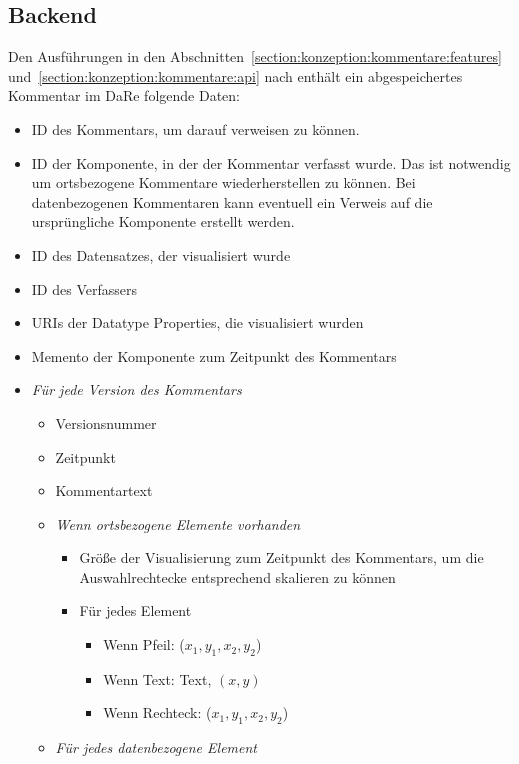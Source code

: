 \documentclass[
	headsepline,
	footsepline,
	fontsize=12pt,
	bibliography=totoc
]{scrbook}
\begin{document}
\subsection{Backend}
\label{section:konzeption:kommentare:backend}



Den Ausführungen in den Abschnitten~\ref{section:konzeption:kommentare:features} und~\ref{section:konzeption:kommentare:api} nach enthält ein abgespeichertes Kommentar im DaRe folgende Daten:

\begin{itemize}
	\item ID des Kommentars, um darauf verweisen zu können.
	\item ID der Komponente, in der der Kommentar verfasst wurde. Das ist notwendig um ortsbezogene Kommentare wiederherstellen zu können. Bei datenbezogenen Kommentaren kann eventuell ein Verweis auf die ursprüngliche Komponente erstellt werden.
	\item ID des Datensatzes, der visualisiert wurde
	\item ID des Verfassers
	\item URIs der Datatype Properties, die visualisiert wurden
	\item Memento der Komponente zum Zeitpunkt des Kommentars
	\item \textit{Für jede Version des Kommentars}
	\begin{itemize}
		\item Versionsnummer
		\item Zeitpunkt
		\item Kommentartext
		\item \textit{Wenn ortsbezogene Elemente vorhanden}
		\begin{itemize}
			\item Größe der Visualisierung zum Zeitpunkt des Kommentars, um die Auswahlrechtecke entsprechend skalieren zu können
			\item Für jedes Element
			\begin{itemize}
				\item Wenn Pfeil: ($x_1,y_1,x_2,y_2$)
				\item Wenn Text: Text, $(x,y)$
				\item Wenn Rechteck: ($x_1,y_1,x_2,y_2$)
			\end{itemize}
		\end{itemize}
	\item \textit{Für jedes datenbezogene Element}

\end{itemize}
\end{itemize}
\end{document}
